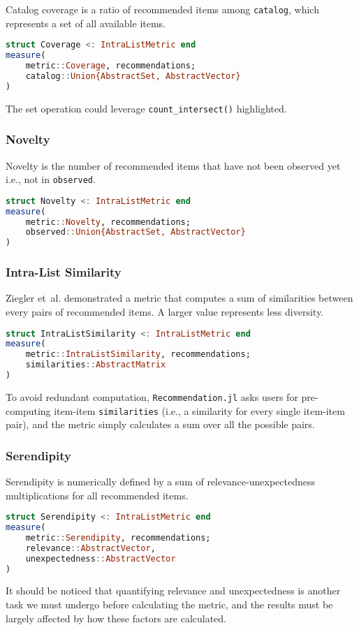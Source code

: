 Catalog coverage is a ratio of recommended items among \texttt{catalog}, which represents a set of all available items.

\begin{lstlisting}[language = Julia]
struct Coverage <: IntraListMetric end
measure(
    metric::Coverage, recommendations;
    catalog::Union{AbstractSet, AbstractVector}
)
\end{lstlisting}

The set operation could leverage \texttt{count\_intersect()}  highlighted.

\subsubsection{Novelty}

Novelty is the number of recommended items that have not been observed yet i.e., not in \texttt{observed}.

\begin{lstlisting}[language = Julia]
struct Novelty <: IntraListMetric end
measure(
    metric::Novelty, recommendations;
    observed::Union{AbstractSet, AbstractVector}
)
\end{lstlisting}

\subsubsection{Intra-List Similarity}

Ziegler et~al. \cite{ziegler2005improving} demonstrated a metric that computes a sum of similarities between every pairs of recommended items. A larger value represents less diversity.

\begin{lstlisting}[language = Julia]
struct IntraListSimilarity <: IntraListMetric end
measure(
    metric::IntraListSimilarity, recommendations;
    similarities::AbstractMatrix
)
\end{lstlisting}

To avoid redundant computation, \texttt{Recommendation.jl} asks users for pre-computing item-item \texttt{similarities} (i.e., a similarity for every single item-item pair), and the metric simply calculates a sum over all the possible pairs.

\subsubsection{Serendipity}

Serendipity is numerically defined by a sum of relevance-unexpectedness multiplications for all recommended items.

\begin{lstlisting}[language = Julia]
struct Serendipity <: IntraListMetric end
measure(
    metric::Serendipity, recommendations;
    relevance::AbstractVector, 
    unexpectedness::AbstractVector
)
\end{lstlisting}

It should be noticed that quantifying relevance and unexpectedness is another task we must undergo before calculating the metric, and the results must be largely affected by how these factors are calculated.
